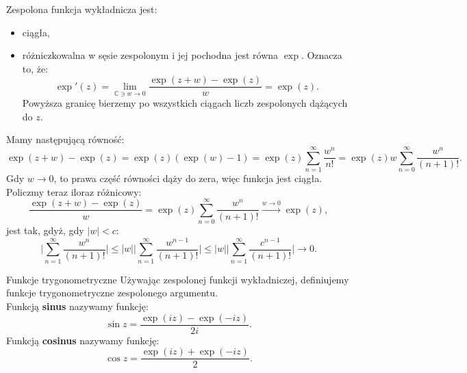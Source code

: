 \documentclass{article}
\newcounter{defi}
\numberwithin{defi}{section}
\numberwithin{defi}{section}
\newcommand{\C}{\mathbb{C}}
\newcommand{\oo}{\infty}
\renewcommand{\leq}{\leqslant}
\newcommand{\tb}[1]{\textbf{#1}}
\begin{document}
\begin{twier}{}
    Zespolona funkcja wykładnicza jest: \begin{itemize}
        \item ciągła,
        \item różniczkowalna w sęsie zespolonym i jej pochodna jest równa $\exp$. Oznacza to, że: \begin{equation}
            \exp'(z) = \lim_{\C \ni w \to 0} \frac{\exp(z + w) - \exp(z)}{w} = \exp(z).
        \end{equation} Powyższa granicę bierzemy po wszystkich ciągach liczb zespolonych dążących do $z$.
    \end{itemize}
\end{twier}

\begin{dow}{}
    Mamy następującą równość: \begin{equation*}
        \exp(z + w) - \exp(z) = \exp(z) (\exp(w) - 1)  = \exp(z) \sum_{n = 1}^{\oo} \frac{w^n}{n!} = \exp(z) w \sum_{n  = 0}^{\oo} \frac{w^n}{(n + 1)!}.
    \end{equation*} Gdy $w \to 0$, to prawa część równości dąży do zera, więc funkcja jest ciągła. Policzmy teraz iloraz różnicowy: \begin{equation*}
        \frac{\exp(z + w) - \exp(z)}{w} = \exp(z) \sum_{n  = 0}^{\oo} \frac{w^n}{(n + 1)!} \xrightarrow{w \to 0} \exp(z),
    \end{equation*} jest tak, gdyż, gdy $|w| < c$: \begin{equation*}
        \big| \sum_{n = 1}^{\oo} \frac{w^n}{(n+1)!} \big| \leq  \big| w \big| \big| \sum_{n = 1}^{\oo} \frac{w^{n-1}}{(n+1)!} \big| \leq \big| w \big| \big| \sum_{n = 1}^{\oo} \frac{c^{n-1}}{(n+1)!} \big| \to 0.
    \end{equation*}
\end{dow}


\begin{defr}{Funkcje trygonometryczne}
    Używając zespolonej funkcji wykładniczej, definiujemy funkcje trygonometryczne zespolonego argumentu. \\
    Funkcją \tb{sinus} nazywamy funkcję: \begin{equation}
        \sin z = \frac{\exp(iz) - \exp(-iz)}{2 i}.
    \end{equation}
    Funkcją \tb{cosinus} nazywamy funkcję: \begin{equation}
        \cos z = \frac{\exp(iz) + \exp(-iz)}{2}.
    \end{equation}
\end{defr}
\end{document}
